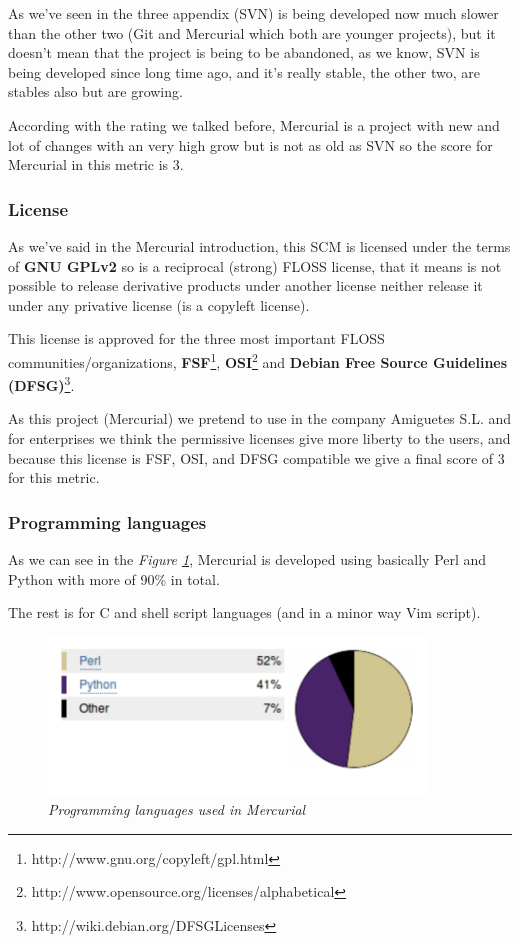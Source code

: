 \documentclass[a4paper,10pt]{article}
\begin{document}
As we've seen in the three appendix (SVN) is being developed now much slower
than the other two (Git and Mercurial which both are younger projects), but it
doesn't mean that the project is being to be abandoned, as we know, SVN is being
developed since long time ago, and it's really stable, the other two, are
stables also but are growing.

According with the rating we talked before, Mercurial is a project with new and
lot of changes with an very high grow but is not as old as SVN so the score for
Mercurial in this metric is 3.

\subsubsection{License} \label{license_mercurial}

As we've said in the Mercurial introduction, this SCM is licensed under the
terms of \textbf{GNU GPLv2} so is a reciprocal (strong) FLOSS license, that it
means is not possible to release derivative products under another license
neither release it under any privative license (is a copyleft license).

This license is approved for the three most important FLOSS
communities/organizations,
\textbf{FSF}\footnote{http://www.gnu.org/copyleft/gpl.html},
\textbf{OSI}\footnote{http://www.opensource.org/licenses/alphabetical} and
\textbf{Debian Free Source Guidelines
(DFSG)}\footnote{http://wiki.debian.org/DFSGLicenses}.

As this project (Mercurial) we pretend to use in the company Amiguetes S.L.
and for enterprises we think the permissive licenses give more liberty to the
users, and because this license is FSF, OSI, and DFSG compatible we give a
final score of 3 for this metric.



\subsubsection{Programming languages} \label{Programming languages}

As we can see in the \textit{Figure \ref{figure:mercurial_languages}},
Mercurial is developed using basically Perl and Python with more of 90\% in
total.

The rest is for C and shell script languages (and in a minor way Vim script).

\begin{figure}[H]
    \centering
    \includegraphics[width=10cm, keepaspectratio]{img/mercurial_languages.pdf}
    \caption{\textit{Programming languages used in Mercurial}}
    \label{figure:mercurial_languages}
 \end{figure}
\end{document}
